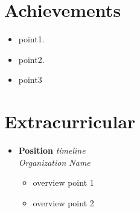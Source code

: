 \documentclass[a4paper,11pt]{article}
\begin{document}
\section{Achievements}
\begin{itemize}[nosep, leftmargin=1em, itemsep=2pt]
    \item {point1}.
    \item {point2}.
    \item {point3}
\end{itemize}

\section{Extracurricular}
\begin{itemize}[nosep, leftmargin=1em, itemsep=2pt, label={}]
    \item 
    \textbf{Position} \hfill \textit{timeline} \\
    \textit{Organization Name}
    \begin{itemize}[nosep, leftmargin=1em, label=\textbullet]
        \item {overview point 1}
        \item {overview point 2}
    \end{itemize}
\end{itemize}
\end{document}
